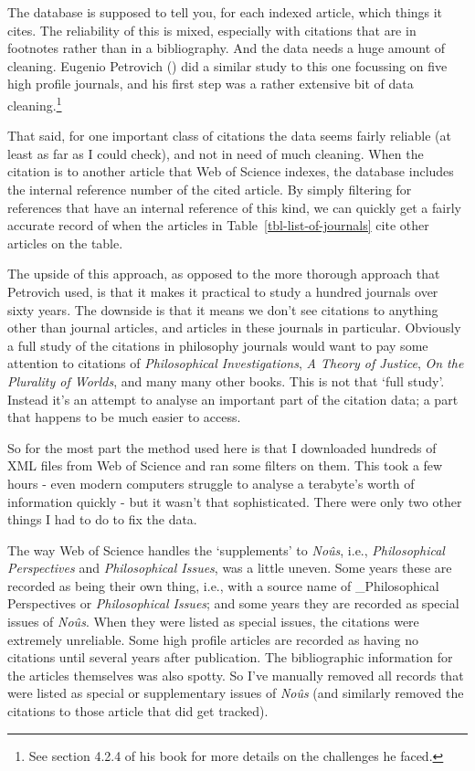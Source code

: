 \documentclass[
  11pt,
  letterpaper,
  DIV=11,
  numbers=noendperiod,
  twoside]{scrartcl}
\begin{document}
The database is supposed to tell you, for each indexed article, which
things it cites. The reliability of this is mixed, especially with
citations that are in footnotes rather than in a bibliography. And the
data needs a huge amount of cleaning. Eugenio Petrovich
() did a similar study to this one
focussing on five high profile journals, and his first step was a rather
extensive bit of data cleaning.\footnote{See section 4.2.4 of his book
  for more details on the challenges he faced.}

That said, for one important class of citations the data seems fairly
reliable (at least as far as I could check), and not in need of much
cleaning. When the citation is to another article that Web of Science
indexes, the database includes the internal reference number of the
cited article. By simply filtering for references that have an internal
reference of this kind, we can quickly get a fairly accurate record of
when the articles in Table~\ref{tbl-list-of-journals} cite other
articles on the table.

The upside of this approach, as opposed to the more thorough approach
that Petrovich used, is that it makes it practical to study a hundred
journals over sixty years. The downside is that it means we don't see
citations to anything other than journal articles, and articles in these
journals in particular. Obviously a full study of the citations in
philosophy journals would want to pay some attention to citations of
\emph{Philosophical Investigations}, \emph{A Theory of Justice},
\emph{On the Plurality of Worlds}, and many many other books. This is
not that `full study'. Instead it's an attempt to analyse an important
part of the citation data; a part that happens to be much easier to
access.

So for the most part the method used here is that I downloaded hundreds
of XML files from Web of Science and ran some filters on them. This took
a few hours - even modern computers struggle to analyse a terabyte's
worth of information quickly - but it wasn't that sophisticated. There
were only two other things I had to do to fix the data.

The way Web of Science handles the `supplements' to \emph{Noûs}, i.e.,
\emph{Philosophical Perspectives} and \emph{Philosophical Issues}, was a
little uneven. Some years these are recorded as being their own thing,
i.e., with a source name of \_Philosophical Perspectives or
\emph{Philosophical Issues}; and some years they are recorded as special
issues of \emph{Noûs}. When they were listed as special issues, the
citations were extremely unreliable. Some high profile articles are
recorded as having no citations until several years after publication.
The bibliographic information for the articles themselves was also
spotty. So I've manually removed all records that were listed as special
or supplementary issues of \emph{Noûs} (and similarly removed the
citations to those article that did get tracked).
\end{document}
